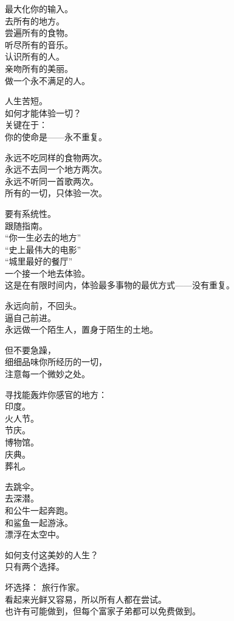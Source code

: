 \documentclass[
]{article}
\begin{document}
最大化你的输入。\\
去所有的地方。\\
尝遍所有的食物。\\
听尽所有的音乐。\\
认识所有的人。\\
亲吻所有的美丽。\\
做一个永不满足的人。

人生苦短。\\
如何才能体验一切？\\
关键在于：\\
你的使命是------永不重复。

永远不吃同样的食物两次。\\
永远不去同一个地方两次。\\
永远不听同一首歌两次。\\
所有的一切，只体验一次。

要有系统性。\\
跟随指南。\\
``你一生必去的地方''\\
``史上最伟大的电影''\\
``城里最好的餐厅''\\
一个接一个地去体验。\\
这是在有限时间内，体验最多事物的最优方式------没有重复。

永远向前，不回头。\\
逼自己前进。\\
永远做一个陌生人，置身于陌生的土地。

但不要急躁，\\
细细品味你所经历的一切，\\
注意每一个微妙之处。

寻找能轰炸你感官的地方：\\
印度。\\
火人节。\\
节庆。\\
博物馆。\\
庆典。\\
葬礼。

去跳伞。\\
去深潜。\\
和公牛一起奔跑。\\
和鲨鱼一起游泳。\\
漂浮在太空中。

如何支付这美妙的人生？\\
只有两个选择。

坏选择： 旅行作家。\\
看起来光鲜又容易，所以所有人都在尝试。\\
也许有可能做到，但每个富家子弟都可以免费做到。
\end{document}
